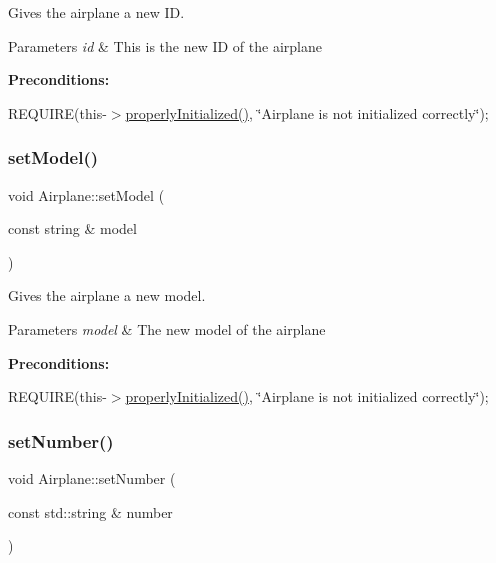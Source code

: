 Gives the airplane a new ID. 


\begin{DoxyParams}{Parameters}
{\em id} & This is the new ID of the airplane\\
\hline
\end{DoxyParams}
{\bfseries Preconditions\+:}
\begin{DoxyItemize}
\item R\+E\+Q\+U\+I\+RE(this-\/$>$\mbox{\hyperlink{class_airplane_a6f80df8f692cc8d67d292c1e9f26d59e}{properly\+Initialized()}}, \char`\"{}\+Airplane is not initialized correctly\char`\"{}); 
\end{DoxyItemize}\mbox{\label{class_airplane_aaeb19ae361b046ce543ad687aea63123}} 
\subsubsection{\texorpdfstring{set\+Model()}{setModel()}}
{\footnotesize\ttfamily void Airplane\+::set\+Model (\begin{DoxyParamCaption}\item[{const string \&}]{model }\end{DoxyParamCaption})}



Gives the airplane a new model. 


\begin{DoxyParams}{Parameters}
{\em model} & The new model of the airplane\\
\hline
\end{DoxyParams}
{\bfseries Preconditions\+:}
\begin{DoxyItemize}
\item R\+E\+Q\+U\+I\+RE(this-\/$>$\mbox{\hyperlink{class_airplane_a6f80df8f692cc8d67d292c1e9f26d59e}{properly\+Initialized()}}, \char`\"{}\+Airplane is not initialized correctly\char`\"{}); 
\end{DoxyItemize}\mbox{\label{class_airplane_af9bf0ea879bf7875b71f552ac9400da7}} 
\subsubsection{\texorpdfstring{set\+Number()}{setNumber()}}
{\footnotesize\ttfamily void Airplane\+::set\+Number (\begin{DoxyParamCaption}\item[{const std\+::string \&}]{number }\end{DoxyParamCaption})}



